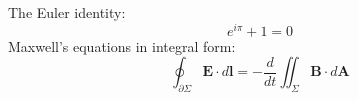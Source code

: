 \documentclass{article}
\begin{document}
The Euler identity:
\[e^{i\pi} + 1 = 0\]
Maxwell's equations in integral form:
\[\oint_{\partial \Sigma} \mathbf{E} \cdot d\mathbf{l} =
  -\frac{d}{dt} \iint_{\Sigma} \mathbf{B} \cdot d\mathbf{A}\]
\end{document}
